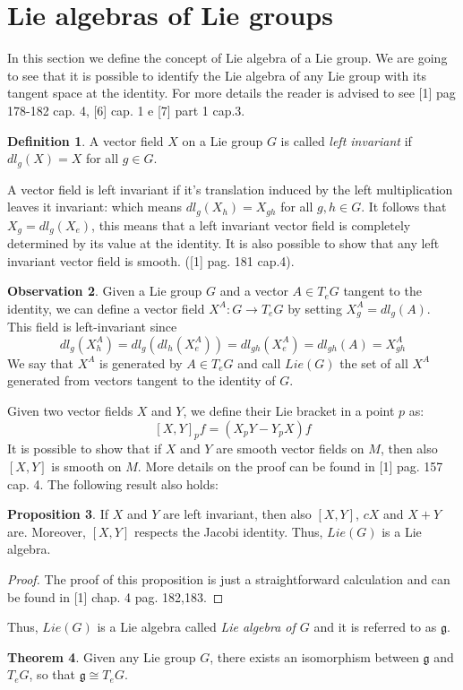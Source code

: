 \documentclass[12pt,a4paper]{report}
\theoremstyle{definition}
\newtheorem{Def}{Definition}[chapter]
\theoremstyle{Theorem}
\newtheorem{Theo}[Def]{Theorem}
\newtheorem{Prop}[Def]{Proposition}
\theoremstyle{definition}
\theoremstyle{definition}
\newtheorem{Obs}[Def]{Observation}
\begin{document}
	\section{Lie algebras of Lie groups}
	In this section we define the concept of Lie algebra of a Lie group. We are going to see that it is possible to identify the Lie algebra of any Lie group with its tangent space at the identity. For more details the reader is advised to see [1] pag 178-182 cap. 4, [6] cap. 1 e [7] part 1 cap.3.
	\begin{Def}
		A vector field $X$ on a Lie group $G$ is called \textit{left invariant} if $dl_g(X)=X$ for all $g\in G$.
	\end{Def}
	A vector field is left invariant if it's translation induced by the left multiplication leaves it invariant: which means $dl_g(X_h)=X_{gh}$ for all $g,h\in G$.
	It follows that $X_g=dl_g(X_e)$, this means that a left invariant vector field is completely determined by its value at the identity. It is also possible to show that any left invariant vector field is smooth. ([1] pag. 181 cap.4).
	\begin{Obs} \label{Obs: 2.2}
		Given a Lie group $G$ and a vector $A\in T_eG$ tangent to the identity, we can define a vector field $X^A:G\rightarrow T_eG$ by setting $X^A_g=dl_g(A)$. This field is left-invariant since $$dl_g(X^A_h)=dl_g(dl_h(X^A_e))=dl_{gh}(X^A_e)=dl_{gh}(A)=X^A_{gh}$$
		We say that $X^A$ is generated by $A\in T_eG$ and call $Lie(G)$ the set of all $X^A$ generated from vectors tangent to the identity of $G$.	
	\end{Obs}
	Given two vector fields $X$ and $Y$, we define their Lie bracket in a point $p$ as:
	$$[X,Y]_pf=(X_pY-Y_pX)f$$
	It is possible to show that if $X$ and $Y$ are smooth vector fields on $M$, then also $[X,Y]$ is smooth on $M$. More details on the proof can be found in [1] pag. 157 cap. 4. The following result also holds:
	\begin{Prop}
		If $X$ and $Y$ are left invariant, then also $[X,Y]$, $cX$ and $X+Y$ are. Moreover, $[X,Y]$ respects the Jacobi identity. Thus, $Lie(G)$ is a Lie algebra.
	\end{Prop}
	\begin{proof}
		The proof of this proposition is just a straightforward calculation and can be found in [1] chap. 4 pag. 182,183.
	\end{proof}
	Thus, $Lie(G)$ is a Lie algebra called \textit{Lie algebra of $G$} and it is referred to as $\mathfrak{g}$.
	\begin{Theo}
		Given any Lie group $G$, there exists an isomorphism between $\mathfrak{g}$ and $T_eG$, so that $\mathfrak{g}\cong T_eG$.
	\end{Theo}
\end{document}
